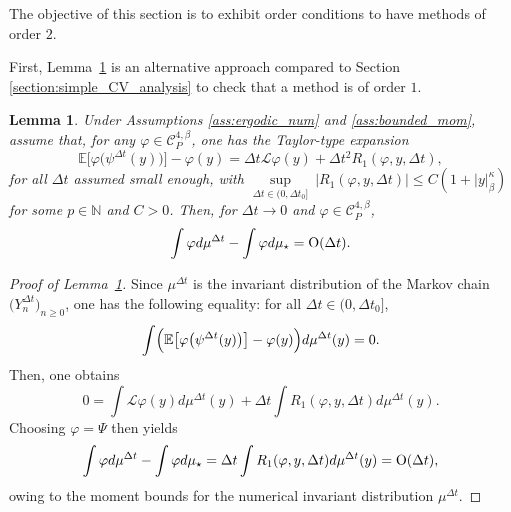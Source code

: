 \documentclass[11pt]{amsart}
\newcommand{\E}{\mathbb{E}}
\newcommand{\N}{\mathbb{N}}
\newtheorem{lemma}[theo]{Lemma}
\begin{document}
The objective of this section is to exhibit order conditions to have methods of order $2$.

First, Lemma~\ref{lem:order1} is an alternative approach compared to Section \ref{section:simple_CV_analysis} to check that a method is of order $1$.
\begin{lemma}\label{lem:order1}
Under Assumptions \ref{ass:ergodic_num} and \ref{ass:bounded_mom}, assume that, for any $\varphi\in\mathcal{C}^{4,\beta}_P$, one has the Taylor-type expansion
\[
\E\bigl[\varphi\bigl(\psi^{\Delta t}(y)\bigr)\bigr]-\varphi(y)=\Delta t\mathcal{L}\varphi(y)+\Delta t^2R_1(\varphi,y,\Delta t),
\]
for all $\Delta t$ assumed small enough,
with $\underset{\Delta t\in(0,\Delta t_0]}\sup~|R_1(\varphi,y,\Delta t)|\le C(1+|y|_\beta^\kappa)$ for some $p\in\N$ and $C>0$.
%
Then, for $\Delta t \rightarrow 0$ and $\varphi\in\mathcal{C}^{4,\beta}_P$,
\begin{equation}\label{eq:expansion_order1}
\int\varphi d\mu^{\Delta t}-\int\varphi d\mu_\star={\rm O}(\Delta t).
\end{equation}
\end{lemma}

\begin{proof}[Proof of Lemma~\ref{lem:order1}]
Since $\mu^{\Delta t}$ is the invariant distribution of the Markov chain $\bigl(Y_n^{\Delta t}\bigr)_{n\ge 0}$, one has the following equality: for all $\Delta t\in(0,\Delta t_0]$,
\begin{equation}\label{eq:equilibrium}
\int \Bigl(\E\bigl[\varphi\bigl(\psi^{\Delta t}(y)\bigr)\bigr]-\varphi(y)\Bigr)d\mu^{\Delta t}(y)=0.
\end{equation}
Then, one obtains
\[
0=\int \mathcal{L}\varphi(y)d\mu^{\Delta t}(y)+\Delta t\int R_1(\varphi,y,\Delta t) d\mu^{\Delta t}(y).
\]
Choosing $\varphi=\Psi$ then yields
\[
\int\varphi d\mu^{\Delta t}-\int\varphi d\mu_\star=\Delta t\int R_1(\varphi,y,\Delta t)d\mu^{\Delta t}(y)={\rm O}(\Delta t),
\]
owing to the moment bounds for the numerical invariant distribution $\mu^{\Delta t}$.
\end{proof}
\end{document}
